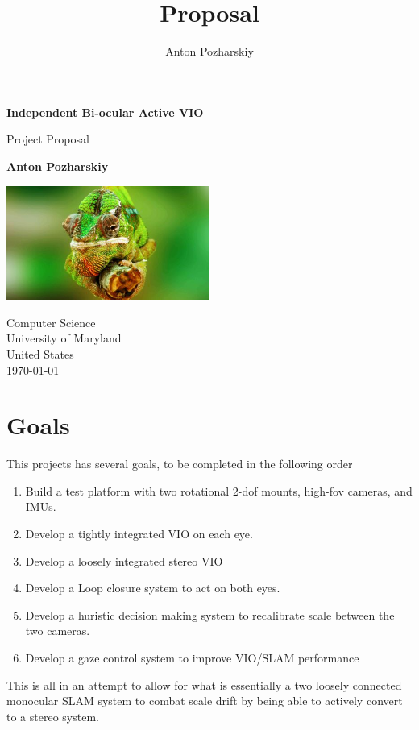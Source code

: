 \documentclass{article}
\title{Proposal}
\author{Anton Pozharskiy}
\begin{document}
\begin{titlepage}
  \begin{center}
    \vspace*{1cm}
    
    \Huge
    \textbf{Independent Bi-ocular Active VIO}
    
    \vspace{0.5cm}
    \LARGE
    Project Proposal
    
    \vspace{1.5cm}
    \Large
    \textbf{Anton Pozharskiy}
    
    \vfill

    \vspace{0.8cm}
    
    \includegraphics[width=0.5\textwidth]{Chmln}
    
    \Large
    Computer Science\\
    University of Maryland\\
    United States\\
    \today
    \end{center}
\end{titlepage}

\newpage

\section{Goals} %
This projects has several goals, to be completed in the following order
\begin{enumerate}
\item Build a test platform with two rotational 2-dof mounts, high-fov cameras, and IMUs.
\item Develop a tightly integrated VIO on each eye.
\item Develop a loosely integrated stereo VIO
\item Develop a Loop closure system to act on both eyes.
\item Develop a huristic decision making system to recalibrate scale between the two cameras.
\item Develop a gaze control system to improve VIO/SLAM performance 
\end{enumerate}
This is all in an attempt to allow for what is essentially a two loosely connected monocular SLAM system to
combat scale drift by being able to actively convert to a stereo system.
\end{document}
